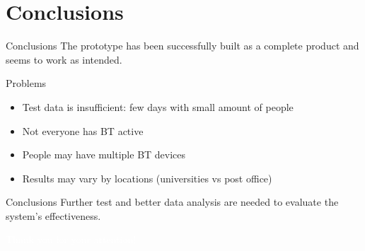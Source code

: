 \documentclass{beamer}
\begin{document}
\section{Conclusions}
\begin{frame}{Conclusions}
	The prototype has been successfully built as a complete product and seems to work as intended.
	\begin{alertblock}{Problems}
		\begin{itemize}
			\item Test data is insufficient: few days with small amount of people
			\item Not everyone has BT active
			\item People may have multiple BT devices
			\item Results may vary by locations (universities vs post office)
		\end{itemize}
	\end{alertblock}
	\begin{exampleblock}{Conclusions}
		Further test and better data analysis are needed to evaluate the system's effectiveness.
	\end{exampleblock}

\end{frame}

\begin{frame}{}
	\begin{center}
		\Huge{\textcolor{white}{Thank you for your attention!}}
	\end{center}
\end{frame}
\end{document}
